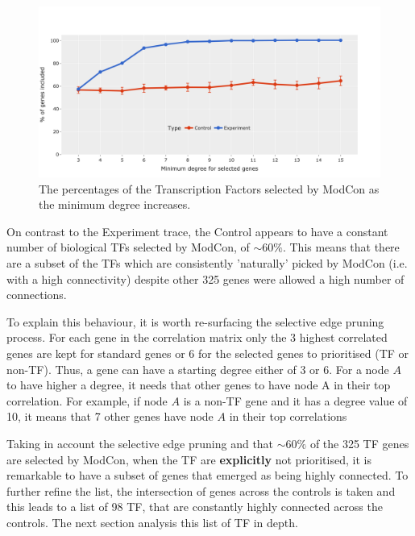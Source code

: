 \begin{figure}[!ht]   
\centering
\includegraphics[width=1.0\textwidth,height=1.0\textheight,keepaspectratio]{Sections/Network_I/Resources/selective_pruning/ctrls_min_dig_mev.png}
  \caption{The percentages of the Transcription Factors selected by ModCon as the minimum degree increases.}
\label{fig:N_I:sel_tfs}
\end{figure}

On contrast to the Experiment trace, the Control appears to have a constant number of biological TFs selected by ModCon, of $\sim60\%$. This means that there are a subset of the TFs which are consistently 'naturally' picked by ModCon (i.e. with a high connectivity) despite other 325 genes were allowed a high number of connections. 

To explain this behaviour, it is worth re-surfacing the selective edge pruning process. For each gene in the correlation matrix only the 3 highest correlated genes are kept for standard genes or 6 for the selected genes to prioritised (TF or non-TF). Thus, a gene can have a starting degree either of 3 or 6. For a node $A$ to have higher a degree, it needs that other genes to have node A in their top correlation. For example, if node $A$ is a non-TF gene and it has a degree value of 10, it means that 7 other genes have node $A$ in their top correlations

Taking in account the selective edge pruning and that $\sim60\%$ of the 325 TF genes are selected by ModCon, when the TF are \textbf{explicitly} not prioritised, it is remarkable to have a subset of genes that emerged as being highly connected. To further refine the list, the intersection of genes across the controls is taken and this leads to a list of 98 TF, that are constantly highly connected across the controls. The next section analysis this list of TF in depth. 

